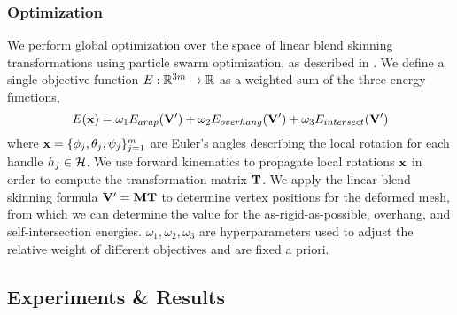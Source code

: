 



\subsubsection*{Optimization}

We perform global optimization over the space of linear blend skinning transformations using particle swarm optimization, as described in \cite{jacobson_matryoshka_2017}. We define a single objective function $E: \mathbb{R}^{3m} \to \mathbb{R}$ as a weighted sum of the three energy functions,
\[
    E(\mathbf{x}) = \omega_1 E_{arap}(\mathbf{V}') + \omega_2 E_{overhang}(\mathbf{V}') + \omega_3 E_{intersect}(\mathbf{V}')
\]
where $\mathbf{x} = \{ \phi_j, \theta_j, \psi_j \}_{j=1}^m$ are Euler's angles describing the local rotation for each handle $h_j \in \mathcal{H}$. We use forward kinematics to propagate local rotations $\mathbf{x}$ in order to compute the transformation matrix $\mathbf{T}$. We apply the linear blend skinning formula $\mathbf{V}' = \mathbf{M} \mathbf{T}$ to determine vertex positions for the deformed mesh, from which we can determine the value for the as-rigid-as-possible, overhang, and self-intersection energies. $\omega_1,\omega_2,\omega_3$ are hyperparameters used to adjust the relative weight of different objectives and are fixed a priori.

\subsection*{Experiments \& Results}

